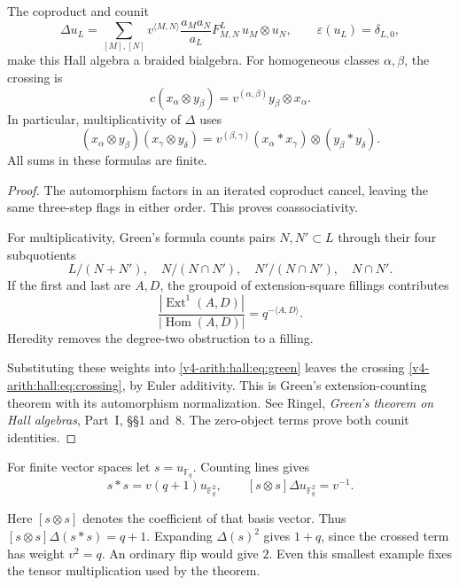 \begin{theorem}
\label{v4-arith:hall:thm:green}
The coproduct and counit
\begin{equation}\label{v4-arith:hall:eq:green}
 \Delta u_L=\sum_{[M],[N]}v^{\langle M,N\rangle}
       \frac{a_Ma_N}{a_L}F^L_{M,N}\,u_M\otimes u_N,
 \qquad \varepsilon(u_L)=\delta_{L,0},
\end{equation}
make this Hall algebra a braided bialgebra. For homogeneous classes
$\alpha,\beta$, the crossing is
\[
 c(x_\alpha\otimes y_\beta)
   =v^{(\alpha,\beta)}y_\beta\otimes x_\alpha.
\]
In particular, multiplicativity of $\Delta$ uses
\begin{equation}\label{v4-arith:hall:eq:crossing}
 (x_\alpha\otimes y_\beta)(x_\gamma\otimes y_\delta)
 =v^{(\beta,\gamma)}(x_\alpha*x_\gamma)
                     \otimes(y_\beta*y_\delta).
\end{equation}
All sums in these formulas are finite.
\end{theorem}
\begin{proof}
The automorphism factors in an iterated coproduct cancel, leaving
the same three-step flags in either order. This proves coassociativity.

For multiplicativity, Green's formula counts pairs $N,N'\subset L$
through their four subquotients
\[
 L/(N+N'),\quad N/(N\cap N'),\quad
 N'/(N\cap N'),\quad N\cap N'.
\]
If the first and last are $A,D$, the groupoid of extension-square
fillings contributes
\[
 \frac{|\operatorname{Ext}^1(A,D)|}
      {|\operatorname{Hom}(A,D)|}
 =q^{-\langle A,D\rangle}.
\]
Heredity removes the degree-two obstruction to a filling.


Substituting these weights into \eqref{v4-arith:hall:eq:green} leaves
the crossing \eqref{v4-arith:hall:eq:crossing}, by Euler additivity.
This is Green's extension-counting theorem with its automorphism
normalization. See Ringel, \emph{Green's theorem on Hall algebras},
Part~I, \S\S1 and~8. The zero-object terms prove both counit identities.
\end{proof}

For finite vector spaces let $s=u_{\mathbb F_q}$. Counting lines gives
\[
 s*s=v(q+1)u_{\mathbb F_q^2},\qquad
 [s\otimes s]\Delta u_{\mathbb F_q^2}=v^{-1}.
\]

Here $[s\otimes s]$ denotes the coefficient of that basis vector.
Thus $[s\otimes s]\Delta(s*s)=q+1$. Expanding $\Delta(s)^2$
gives $1+q$, since the crossed term has weight $v^2=q$.
An ordinary flip would give $2$. Even this smallest example fixes
the tensor multiplication used by the theorem.

